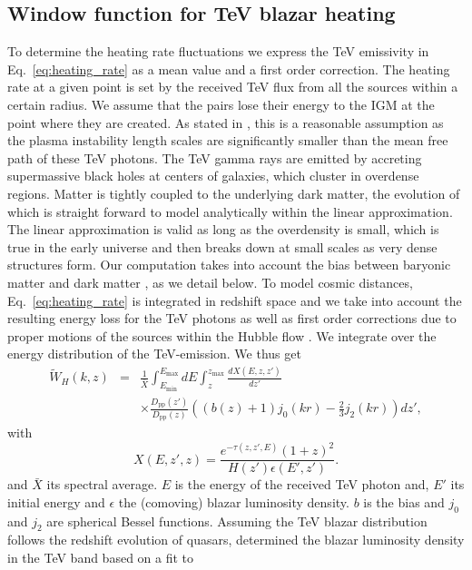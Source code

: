 \documentclass[twocolumns]{emulateapj}
\begin{document}
\subsection{Window function for TeV blazar heating}\label{sec:window}
To determine the heating rate fluctuations we express the TeV emissivity in Eq.~\eqref{eq:heating_rate} as a mean value and a first order correction. The heating rate at a given point is set by the received TeV flux from all the sources within a certain radius. We assume that the pairs lose their energy to the IGM at the point where they are created. As stated in \citet{2012ApJ...752...22B}, this is a reasonable assumption as the plasma instability length scales are significantly smaller than the mean free path of these TeV photons.
The TeV gamma rays are emitted by accreting supermassive black holes at centers of galaxies, which cluster in overdense regions. Matter is tightly coupled to the underlying dark matter, the evolution of which is straight forward to model analytically within the linear approximation. The linear approximation is valid as long as the overdensity is small, which is true in the early universe and then breaks down at small scales as very dense structures form. Our computation takes into account the bias between baryonic matter and dark matter \citep{1996MNRAS.282..347M}, as we detail below.
To model cosmic distances, Eq.~\eqref{eq:heating_rate} is integrated in redshift space and we take into account the resulting energy loss for the TeV photons as well as first order corrections due to proper motions of the sources within the Hubble flow \citep{1987MNRAS.227....1K}. We integrate over the energy distribution of the TeV-emission. We thus get
\begin{eqnarray}
\label{eq:window}
\tilde{W}_H(k,z)&=&\frac{1}{\bar{X}}\int_{E_{\mathrm{min}}}^{E_{\mathrm{max}}}dE\int_z^{z_{\mathrm{max}}}\frac{dX(E,z,z')}{dz'} \\
&&\times \frac{D_{\mathrm{pp}}(z')}{D_{\mathrm{pp}}(z)}\left((b(z)+1)j_0(kr)-\frac{2}{3}j_2(kr)\right)dz', \nonumber
\end{eqnarray}
with
\begin{equation}
\label{eq:define_X}
X(E,z',z)=\frac{e^{-\tau(z,z',E)}(1+z)^2}{H(z')\epsilon(E',z')}.
\end{equation}
and $\bar{X}$ its spectral average. $E$ is the energy of the received TeV photon and, $E'$ its initial energy and $\epsilon$ the (comoving) blazar luminosity density. $b$ is the bias and $j_0$ and $j_2$ are spherical Bessel functions.
Assuming the TeV blazar distribution follows the redshift evolution of quasars, \citet{2012ApJ...752...22B} determined the blazar luminosity density in the TeV band based on a fit to \citet{2007ApJ...654..731H}
\end{document}
